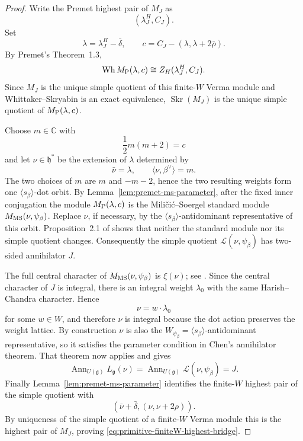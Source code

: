 \documentclass[11pt]{amsart}
\theoremstyle{remark}
\numberwithin{equation}{section}
\begin{document}
\begin{proof}
Write the Premet highest pair of \(M_J\) as
\[
   (\lambda_J^H,C_J).
\]
Set
\[
   \lambda=\lambda_J^H-\bar\delta,
   \qquad
   c=C_J-(\lambda,\lambda+2\bar\rho).
\]
By Premet's Theorem~1.3,
\[
   \operatorname{Wh}M_{\rm P}(\lambda,c)
   \cong
   Z_H(\lambda_J^H,C_J).
\]
Since \(M_J\) is the unique simple quotient of this finite-\(W\) Verma
module and Whittaker--Skryabin is an exact equivalence,
\(\operatorname{Skr}(M_J)\) is the unique simple quotient of
\(M_{\rm P}(\lambda,c)\).

Choose \(m\in\mathbb C\) with
\[
   \frac12m(m+2)=c
\]
and let \(\nu\in\mathfrak h^*\) be the extension of \(\lambda\) determined
by
\[
   \bar\nu=\lambda,
   \qquad
   \langle\nu,\beta^\vee\rangle=m.
\]
The two choices of \(m\) are \(m\) and \(-m-2\), hence the two resulting
weights form one \(\langle s_\beta\rangle\)-dot orbit.  By
Lemma~\ref{lem:premet-ms-parameter}, after the fixed inner conjugation the
module \(M_{\rm P}(\lambda,c)\) is the Mili\v{c}i\'c--Soergel standard
module \(M_{\rm MS}(\nu,\psi_\beta)\).  Replace \(\nu\), if necessary,
by the \(\langle s_\beta\rangle\)-antidominant representative of this
orbit.  Proposition~2.1 of \cite{MilicicSoergel1997} shows that neither the
standard module nor its simple quotient changes.  Consequently the simple
quotient \(\mathcal L(\nu,\psi_\beta)\) has two-sided annihilator \(J\).

The full central character of \(M_{\rm MS}(\nu,\psi_\beta)\) is
\(\xi(\nu)\); see \cite[Section~2]{MilicicSoergel1997}.  Since the central
character of \(J\) is integral, there is an integral weight \(\lambda_0\)
with the same Harish--Chandra character.  Hence
\[
   \nu=w\mathbin\cdot\lambda_0
\]
for some \(w\in W\), and therefore \(\nu\) is integral because the dot
action preserves the weight lattice.  By construction \(\nu\) is also the
\(W_{\psi_\beta}=\langle s_\beta\rangle\)-antidominant representative, so
it satisfies the parameter condition in Chen's annihilator theorem.
That theorem now applies and gives
\[
   \operatorname{Ann}_{U(\mathfrak g)}L_{\mathfrak g}(\nu)
   =
   \operatorname{Ann}_{U(\mathfrak g)}
      \mathcal L(\nu,\psi_\beta)
   =J.
\]
Finally Lemma~\ref{lem:premet-ms-parameter} identifies the finite-\(W\)
highest pair of the simple quotient with
\[
   \left(
      \bar\nu+\bar\delta,
      (\nu,\nu+2\rho)
   \right).
\]
By uniqueness of the simple quotient of a finite-\(W\) Verma module this
is the highest pair of \(M_J\), proving
\eqref{eq:primitive-finiteW-highest-bridge}.


\end{proof}
\end{document}
